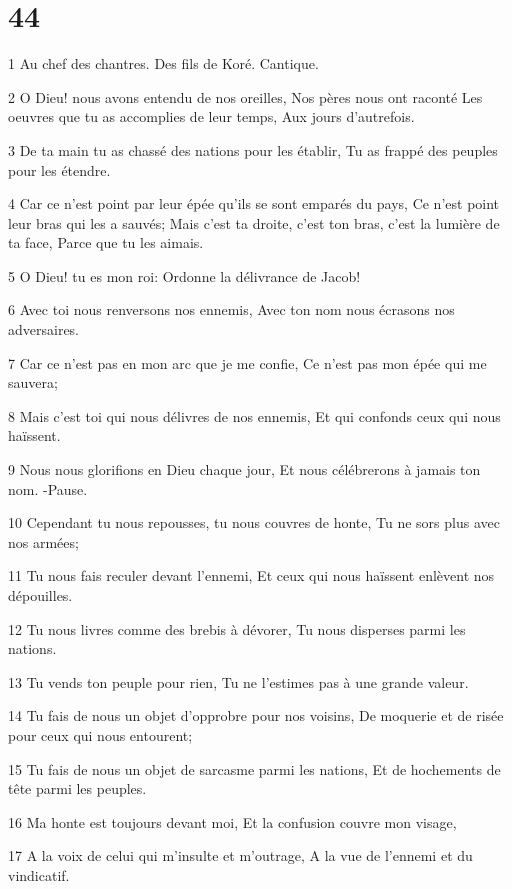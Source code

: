 \chapter{44}

\par 1 Au chef des chantres. Des fils de Koré. Cantique.
\par 2 O Dieu! nous avons entendu de nos oreilles, Nos pères nous ont raconté Les oeuvres que tu as accomplies de leur temps, Aux jours d'autrefois.
\par 3 De ta main tu as chassé des nations pour les établir, Tu as frappé des peuples pour les étendre.
\par 4 Car ce n'est point par leur épée qu'ils se sont emparés du pays, Ce n'est point leur bras qui les a sauvés; Mais c'est ta droite, c'est ton bras, c'est la lumière de ta face, Parce que tu les aimais.
\par 5 O Dieu! tu es mon roi: Ordonne la délivrance de Jacob!
\par 6 Avec toi nous renversons nos ennemis, Avec ton nom nous écrasons nos adversaires.
\par 7 Car ce n'est pas en mon arc que je me confie, Ce n'est pas mon épée qui me sauvera;
\par 8 Mais c'est toi qui nous délivres de nos ennemis, Et qui confonds ceux qui nous haïssent.
\par 9 Nous nous glorifions en Dieu chaque jour, Et nous célébrerons à jamais ton nom. -Pause.
\par 10 Cependant tu nous repousses, tu nous couvres de honte, Tu ne sors plus avec nos armées;
\par 11 Tu nous fais reculer devant l'ennemi, Et ceux qui nous haïssent enlèvent nos dépouilles.
\par 12 Tu nous livres comme des brebis à dévorer, Tu nous disperses parmi les nations.
\par 13 Tu vends ton peuple pour rien, Tu ne l'estimes pas à une grande valeur.
\par 14 Tu fais de nous un objet d'opprobre pour nos voisins, De moquerie et de risée pour ceux qui nous entourent;
\par 15 Tu fais de nous un objet de sarcasme parmi les nations, Et de hochements de tête parmi les peuples.
\par 16 Ma honte est toujours devant moi, Et la confusion couvre mon visage,
\par 17 A la voix de celui qui m'insulte et m'outrage, A la vue de l'ennemi et du vindicatif.
